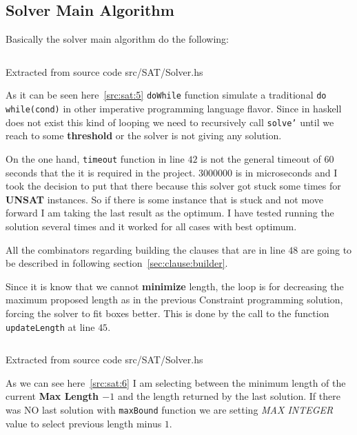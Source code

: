 \documentclass[12pt, a4paper]{article}
\begin{document}
\subsection{Solver Main Algorithm}
Basically the solver main algorithm do the following:

\begin{listing}[H]
  \inputminted[firstline=30, lastline=54, linenos, breaklines]{haskell}{../src/SAT/Solver.hs}
  \caption{Extracted from source code src/SAT/Solver.hs}
  \label{src:sat:5}
\end{listing}

As it can be seen here~\ref{src:sat:5} \texttt{doWhile} function simulate a traditional \texttt{do   while(cond)} in other imperative programming language flavor. Since in \acrshort{haskell} does not exist this kind of looping we need to recursively call \texttt{solve'} until we reach to some \textbf{threshold} or the solver is not giving any solution.

On the one hand, \texttt{timeout} function in line $42$ is not the general timeout of $60$ seconds that the it is required in the project. $3000000$ is in microseconds and I took the decision to put that there because this solver got stuck some times for \textbf{UNSAT} instances. So if there is some instance that is stuck and not move forward I am taking the last result as the optimum. I have tested running the solution several times and it worked for all cases with best optimum.

All the combinators regarding building the clauses that are in line $48$ are going to be described in following section~\ref{sec:clause:builder}.

Since it is know that we cannot \textbf{minimize} length, the loop is for decreasing the maximum proposed length as in the previous Constraint programming solution, forcing the solver to fit boxes better. This is done by the call to the function \texttt{updateLength} at line $45$.

\begin{listing}[H]
  \inputminted[firstline=108, lastline=114, linenos, breaklines]{haskell}{../src/SAT/Solver.hs}
  \caption{Extracted from source code src/SAT/Solver.hs}
  \label{src:sat:6}
\end{listing}

As we can see here~\ref{src:sat:6} I am selecting between the minimum length of the current \textbf{Max Length $-1$} and the length returned by the last solution. If there was NO last solution with \texttt{maxBound} function we are setting \textit{MAX INTEGER} value to select previous length minus $1$.
\end{document}
